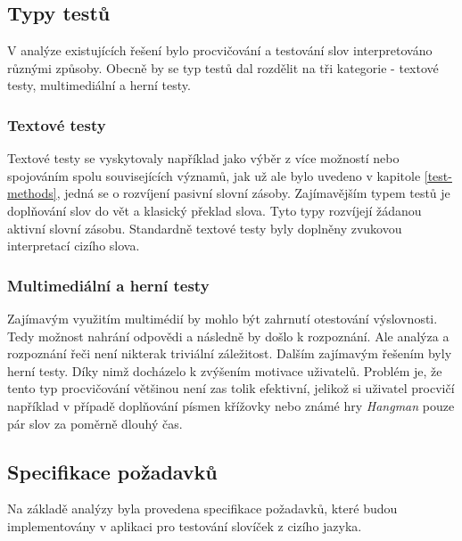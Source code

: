 \documentclass[a4paper,11pt,titlepage,fleqn]{article}
\begin{document}
        \subsection{Typy testů}

            V analýze existujících řešení bylo procvičování a testování slov interpretováno různými způsoby. Obecně by se typ testů dal rozdělit na tři kategorie - textové testy, multimediální a herní testy.

            \subsubsection{Textové testy}
                Textové testy se vyskytovaly například jako výběr z více možností nebo spojováním spolu souvisejících významů, jak už ale bylo uvedeno v kapitole \ref{test-methods}, jedná se o rozvíjení pasivní slovní zásoby. Zajímavějším typem testů je doplňování slov do vět a klasický překlad slova. Tyto typy rozvíjejí žádanou aktivní slovní zásobu. Standardně textové testy byly doplněny zvukovou interpretací cizího slova.

            \subsubsection{Multimediální a herní testy}
                Zajímavým využitím multimédií by mohlo být zahrnutí otestování výslovnosti. Tedy možnost nahrání odpovědi a následně by došlo k rozpoznání. Ale analýza a rozpoznání řeči není nikterak triviální záležitost. Dalším zajímavým řešením byly herní testy. Díky nimž docházelo k zvýšením motivace uživatelů. Problém je, že tento typ procvičování většinou není zas tolik efektivní, jelikož si uživatel procvičí například v případě doplňování písmen křížovky nebo známé hry \textit{Hangman} pouze pár slov za poměrně dlouhý čas.  

    \subsection{Specifikace požadavků}
        Na základě analýzy byla provedena specifikace požadavků, které budou implementovány v aplikaci pro testování slovíček z cizího jazyka.
\end{document}
